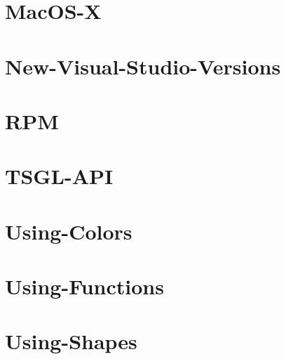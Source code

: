 \documentclass[twoside]{book}
\begin{document}
\chapter{Mac\-O\-S-\/\-X}
\label{md__home_kodemonkey_workspace__t_s_g_l_docs-wiki__mac_o_s-_x}
\hypertarget{md__home_kodemonkey_workspace__t_s_g_l_docs-wiki__mac_o_s-_x}{}

\chapter{New-\/\-Visual-\/\-Studio-\/\-Versions}
\label{md__home_kodemonkey_workspace__t_s_g_l_docs-wiki__new-_visual-_studio-_versions}
\hypertarget{md__home_kodemonkey_workspace__t_s_g_l_docs-wiki__new-_visual-_studio-_versions}{}

\chapter{R\-P\-M}
\label{md__home_kodemonkey_workspace__t_s_g_l_docs-wiki__r_p_m}
\hypertarget{md__home_kodemonkey_workspace__t_s_g_l_docs-wiki__r_p_m}{}

\chapter{T\-S\-G\-L-\/\-A\-P\-I}
\label{md__home_kodemonkey_workspace__t_s_g_l_docs-wiki__t_s_g_l-_a_p_i}
\hypertarget{md__home_kodemonkey_workspace__t_s_g_l_docs-wiki__t_s_g_l-_a_p_i}{}

\chapter{Using-\/\-Colors}
\label{md__home_kodemonkey_workspace__t_s_g_l_docs-wiki_tutorials__using-_colors}
\hypertarget{md__home_kodemonkey_workspace__t_s_g_l_docs-wiki_tutorials__using-_colors}{}

\chapter{Using-\/\-Functions}
\label{md__home_kodemonkey_workspace__t_s_g_l_docs-wiki_tutorials__using-_functions}
\hypertarget{md__home_kodemonkey_workspace__t_s_g_l_docs-wiki_tutorials__using-_functions}{}

\chapter{Using-\/\-Shapes}
\label{md__home_kodemonkey_workspace__t_s_g_l_docs-wiki_tutorials__using-_shapes}
\hypertarget{md__home_kodemonkey_workspace__t_s_g_l_docs-wiki_tutorials__using-_shapes}{}

\end{document}
